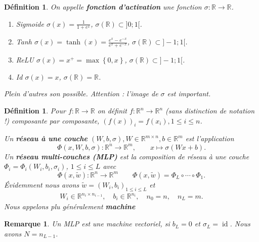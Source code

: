 \documentclass[11pt,a4paper]{article}
\newcommand{\R}{\mathbb R}
\newcommand{\Set}[1]{\left\{#1\right\}}
\newcommand{\id}{\operatorname{id}}
\newtheorem{remark}[theorem]{Remarque}
\newtheorem{definition}[theorem]{Définition}
\begin{document}
%
%
\begin{definition}\label{definition:}
On appelle \textbf{fonction d'activation} une fonction $\sigma:\R\to\R$.
\begin{enumerate}
\item Sigmoide $\sigma(x) = \frac{1}{1+e^x}$, \quad $\sigma(\R) \subset ]0;1[$.
\item Tanh $\sigma(x) = \tanh(x) = \frac{e^x-e^{-x}}{e^x+e^{-x}}$, \quad $\sigma(\R) \subset ]-1;1[$.
\item ReLU $\sigma(x) = x^+ = \max\Set{0,x}$, \quad $\sigma(\R) \subset ]-1;1[$.
\item Id $\sigma(x) = x$, \quad $\sigma(\R) =\R$.
\end{enumerate}
Plein d'autres son possible. Attention : l'image de $\sigma$ est important.
\end{definition}
%
%
\begin{definition}\label{definition:}
Pour $f:\R\to \R$ on définit $f:\R^n\to\R^n$ (sans distinction de notation !) composante par composante, $\left(f(x)\right)_i = f(x_i), 1\le i\le n$. 

Un \textbf{réseau à une couche} $(W,b,\sigma), W\in \R^{m\times n}, b\in \R^m$ est l'application 
%
\begin{equation}\label{equation:}
\Phi(x, W,b,\sigma):\R^n\to\R^m,\qquad x \mapsto \sigma(W x + b).
\end{equation}
%
Un \textbf{réseau multi-couches (MLP)} est la composition de réseau à une couche $\Phi_i=\Phi_i(W_i,b_i,\sigma_i)$, $1\le i\le L$ avec 
%
\begin{equation}\label{equation:}
\Phi(x, \tilde w):\R^n\to \R^m\qquad \Phi(x, \tilde w) = \Phi_L \circ \cdots \circ \Phi_1.
\end{equation}
%
Évidemment nous avons $\tilde w = (W_i,b_i)_{1\le i\le L}$ et
\begin{align*}
W_i\in \R^{n_i\times n_{i-1}},\quad b_i\in \R^{n_i},\quad n_0=n,\quad n_L = m.
\end{align*}
%
Nous appelons plu généralement \textbf{machine} 
\end{definition}
%
%
\begin{remark}\label{remark:}
Un MLP est une machine vectoriel, si $b_L=0$ et $\sigma_L=\id$. Nous avons $N=n_{L-1}$. 
\end{remark}
\end{document}
